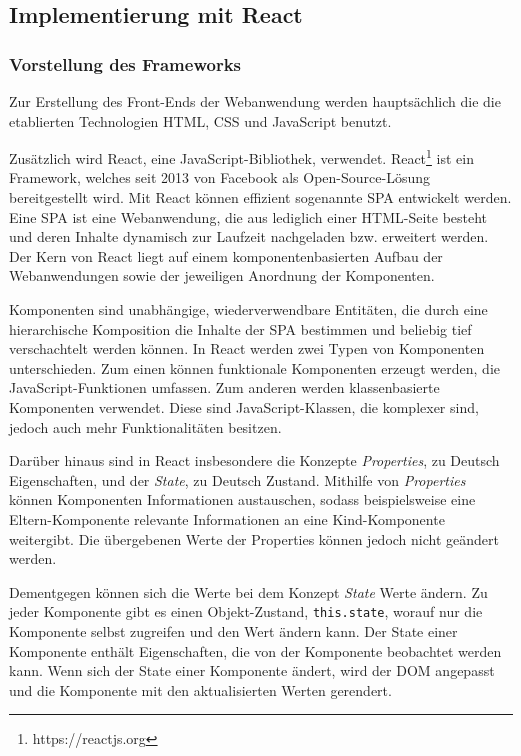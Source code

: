 \subsection{Implementierung mit React}
\subsubsection{Vorstellung des Frameworks}
Zur Erstellung des Front-Ends der Webanwendung werden hauptsächlich die die etablierten Technologien \ac{HTML}, \ac{CSS} und JavaScript benutzt.

Zusätzlich wird React, eine JavaScript-Bibliothek, verwendet.
React\footnote{https://reactjs.org} ist ein Framework, welches seit 2013 von Facebook als Open-Source-Lösung bereitgestellt wird.\autocite[Vgl.][S. 3]{React2019} 
Mit React können effizient sogenannte \ac{SPA} entwickelt werden. 
Eine \ac{SPA} ist eine Webanwendung, die aus lediglich einer \ac{HTML}-Seite besteht und deren Inhalte dynamisch zur Laufzeit nachgeladen bzw. erweitert werden.
Der Kern von React liegt auf einem komponentenbasierten Aufbau der Webanwendungen sowie der jeweiligen Anordnung der Komponenten.\autocite[Vgl.][S. 3]{React2019} 

Komponenten sind unabhängige, wiederverwendbare Entitäten, die durch eine hierarchische Komposition die Inhalte der \ac{SPA} bestimmen und beliebig tief verschachtelt werden können.
In React werden zwei Typen von Komponenten unterschieden. 
Zum einen können funktionale Komponenten erzeugt werden, die JavaScript-Funktionen umfassen. 
Zum anderen werden klassenbasierte Komponenten verwendet. Diese sind JavaScript-Klassen, die komplexer sind, jedoch auch mehr Funktionalitäten besitzen. 

Darüber hinaus sind in React insbesondere die Konzepte \textit{Properties}, zu Deutsch Eigenschaften, und der \textit{State}, zu Deutsch Zustand. 
Mithilfe von \textit{Properties} können Komponenten Informationen austauschen, sodass beispielsweise eine Eltern-Komponente relevante Informationen an eine Kind-Komponente weitergibt. 
Die übergebenen Werte der Properties können jedoch nicht geändert werden. 

Dementgegen können sich die Werte bei dem Konzept \textit{State} Werte ändern. 
Zu jeder Komponente gibt es einen Objekt-Zustand, \texttt{this.state}, worauf nur die Komponente selbst zugreifen und den Wert ändern kann. 
Der State einer Komponente enthält Eigenschaften, die von der Komponente beobachtet werden kann. 
Wenn sich der State einer Komponente ändert, wird der \ac{DOM} angepasst und die Komponente mit den aktualisierten Werten gerendert. 

